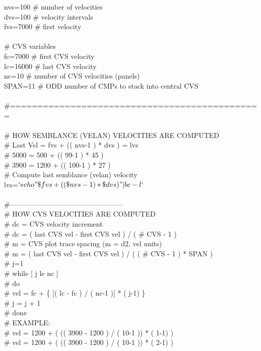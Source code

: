 nvs=100  \# number of velocities \\
dvs=100   \# velocity intervals \\
fvs=7000 \# first velocity \\
 \\
\# CVS variables \\
fc=7000 \# first CVS velocity \\
lc=16000 \# last CVS velocity \\
nc=10   \# number of CVS velocities (panels) \\
SPAN=11   \# ODD number of CMPs to stack into central CVS \\
 \\
\#============================================== \\
 \\
\# HOW SEMBLANCE (VELAN) VELOCITIES ARE COMPUTED \\
\# Last Vel =  fvs + (( nvs-1 ) * dvs ) = lvs \\
\#     5000 =  500 + ((  99-1 ) * 45  ) \\
\#     3900 = 1200 + (( 100-1 ) * 27  ) \\
\# Compute last semblance (velan) velocity \\
lvs=$`echo "\$fvs + (( \$nvs - 1 ) * \$dvs )" | bc -l`$ \\
 \\
\#------------------------------------------------ \\
\# HOW CVS VELOCITIES ARE COMPUTED \\
\# dc = CVS velocity increment \\
\# dc = ( last CVS vel - first CVS vel ) / ( \# CVS - 1 ) \\
\# m = CVS plot trace spacing (m = d2, vel units) \\
\# m = ( last CVS vel - first CVS vel ) / ( ( \# CVS - 1 ) * SPAN ) \\
\# j=1 \\
\# while [ j le nc ] \\
\# do \\
\#   vel =  fc  + \{ [(   lc - fc   ) / ( nc-1 )] * ( j-1) \} \\
\#   j = j + 1 \\
\# done \\
\# EXAMPLE: \\
\#   vel = 1200 + ( (( 3900 - 1200 ) / ( 10-1 )) * ( 1-1) ) \\
\#   vel = 1200 + ( (( 3900 - 1200 ) / ( 10-1 )) * ( 2-1) ) \\
